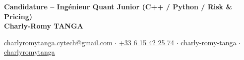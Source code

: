 \begin{center}
    \textbf{\LARGE Candidature -- Ingénieur Quant Junior (C++ / Python / Risk \& Pricing)}\\[0.2cm]
    \textbf{\large Charly-Romy TANGA}\\[0.2cm]
    \normalsize

    \href{mailto:charlyromytanga.cytech@gmail.com}{\faEnvelope[regular]\hspace{0.13cm}charlyromytanga.cytech@gmail.com}
    \quad$\cdot$\quad
    \href{tel:+33615422574}{\faPhone*\hspace{0.13cm}+33 6 15 42 25 74}
    \quad$\cdot$\quad
    \href{https://www.linkedin.com/in/charly-romy-tanga}{\faLinkedin\hspace{0.13cm}charly-romy-tanga}
    \quad$\cdot$\quad
    \href{https://github.com/charlyromytanga}{\faGithub\hspace{0.13cm}charlyromytanga}
\end{center}
